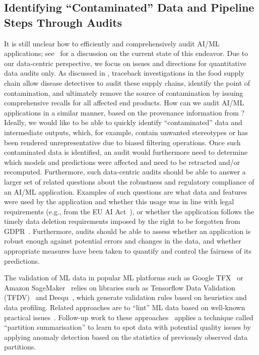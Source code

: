 \subsection{Identifying ``Contaminated'' Data and Pipeline Steps Through Audits}
\label{sec:vision-audit}

It is still unclear how to efficiently and comprehensively audit AI/ML applications; see~\cite {birhane2024ai,sandvig2014auditing} for a discussion on the current state of this endeavor. Due to our data-centric perspective, we focus on issues and directions for quantitative data audits only.
%
As discussed in , traceback investigations in the food supply chain allow disease detectives to audit these supply chains, identify the point of contamination, and ultimately remove the source of contamination by issuing comprehensive recalls for all affected end products. How can we audit AI/ML applications in a similar manner, based on the provenance information from ? Ideally, we would like to be able to quickly identify ``contaminated'' data and intermediate outputs, which, for example, contain unwanted stereotypes or has been rendered unrepresentative due to biased filtering operations. Once such contaminated data is identified, an audit would furthermore need to determine which models and predictions were affected and need to be retracted and/or recomputed. Furthermore, such data-centric audits should be able to answer a larger set of related questions about the robustness and regulatory compliance of an AI/ML application. Examples of such questions are what data and features were used by the application and whether this usage was in line with legal requirements (e.g., from the EU AI Act~\cite{euaiact}), or whether the application follows the timely data deletion requirements imposed by the right to be forgotten from GDPR~\cite{GDPRart17}. Furthermore, audits should be able to assess whether an application is robust enough against potential errors and changes in the data, and whether appropriate measures have been taken to quantify and control the fairness of its predictions. 


 The validation of ML data in popular ML platforms such as Google TFX~\cite{baylor2017tfx} or Amazon SageMaker~\cite{nigenda2022amazon} relies on libraries such as Tensorflow Data Validation (TFDV)~\cite{breck2019data} and Deequ~\cite{schelter2018automating,schelter2019differential}, which generate validation rules based on heuristics and data profiling. Related approaches are to ``lint'' ML data based on well-known practical issues~\cite{hynes2017data}. Follow-up work to these approaches~\cite{redyuk2021automating,shankar2023automatic} applies a technique called ``partition summarisation'' to learn to spot data with potential quality issues by applying anomaly detection based on the statistics of previously observed data partitions.

